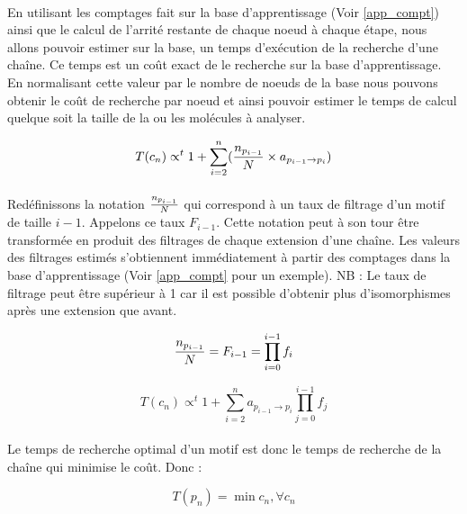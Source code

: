 \documentclass[12pt,french,twoside]{report}
\begin{document}
\paragraph{}En utilisant les comptages fait sur la base d'apprentissage (Voir \ref{app_compt}) ainsi que le calcul de l'arrité
restante de chaque noeud à chaque étape, nous allons pouvoir estimer sur la base, un temps d'exécution de la recherche d'une
chaîne. Ce temps est un coût exact de le recherche sur la base d'apprentissage. En normalisant cette valeur par le nombre de
noeuds de la base nous pouvons obtenir le coût de recherche par noeud et ainsi pouvoir estimer le temps de calcul quelque soit
la taille de la ou les molécules à analyser.

\begin{equation}
 T(c_n) \propto^t 1 + \sum_{i=2}^n ({n_{p_{i-1}} \over N} \times a_{p_{i-1} \rightarrow p_i})
\end{equation}

\paragraph{}Redéfinissons la notation ${n_{p_{i-1}} \over N}$ qui correspond à un taux de filtrage d'un motif de taille $i-1$.
Appelons ce taux $F_{i-1}$. Cette notation peut à son tour être transformée en
produit des filtrages de chaque extension d'une chaîne. Les valeurs des filtrages estimés s'obtiennent immédiatement à partir des
comptages dans la base d'apprentissage (Voir \ref{app_compt} pour un exemple). NB : Le taux de filtrage peut être supérieur à 1
car il est possible d'obtenir plus d'isomorphismes après une extension que avant.

\begin{equation}
 {n_{p_{i-1}} \over N} = F_{i-1} = \prod_{i=0}^{i-1} f_i
\end{equation}

\begin{equation}
 T(c_n) \propto^t 1 + \sum_{i=2}^n a_{p_{i-1} \rightarrow p_i} \prod_{j=0}^{i-1} f_j
\end{equation}

\paragraph{}Le temps de recherche optimal d'un motif est donc le temps de recherche de la chaîne qui minimise le coût. Donc :

\begin{equation}
 T(p_n) = \min c_n, \forall c_n
\end{equation}
\end{document}
